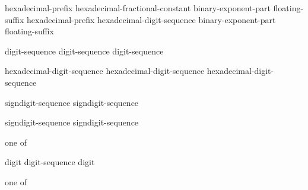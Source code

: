 \begin{bnf}
\br
    hexadecimal-prefix hexadecimal-fractional-constant binary-exponent-part floating-suffix\opt\br
    hexadecimal-prefix hexadecimal-digit-sequence binary-exponent-part floating-suffix\opt
\end{bnf}

\begin{bnf}
\br
    digit-sequence\opt{}  digit-sequence\br
    digit-sequence 
\end{bnf}

\begin{bnf}
\br
    hexadecimal-digit-sequence\opt{}  hexadecimal-digit-sequence\br
    hexadecimal-digit-sequence 
\end{bnf}

\begin{bnf}
\br
     sign\opt digit-sequence\br
     sign\opt digit-sequence
\end{bnf}

\begin{bnf}
\br
     sign\opt digit-sequence\br
     sign\opt digit-sequence
\end{bnf}

\begin{bnf}
 \textnormal{one of}\br
    \terminal{+  -}
\end{bnf}

\begin{bnf}
\br
    digit\br
    digit-sequence \opt digit
\end{bnf}

\begin{bnf}
 \textnormal{one of}\br
\end{bnf}

